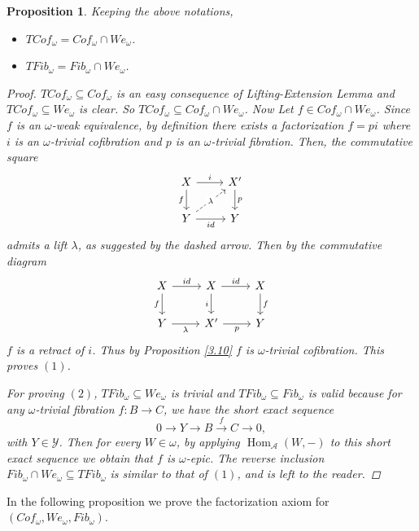 \documentclass[12pt]{amsart}
\numberwithin{equation}{section}
\newtheorem{proposition}[lemma]{Proposition}
\theoremstyle{definition}
\DeclareMathOperator{\Hom}{Hom}
\newtheorem*{theorem 0*}{Theorem}
\newtheorem*{theorem a*}{Theorem A}
\newtheorem*{theorem b*}{Theorem B}
\newcounter{diagram}
\numberwithin{diagram}{section}
\begin{document}
\begin{proposition}\label{3.11}
Keeping the above notations,
\begin{itemize}
\item[(1)]
$TCof_{\omega}=Cof_{\omega}\cap We_{\omega}$.
\item[(2)]
$TFib_{\omega}=Fib_{\omega}\cap We_{\omega}$.
\end{itemize}
\begin{proof}
$TCof_{\omega}\subseteq Cof_{\omega}$ is an easy consequence of Lifting-Extension Lemma and $TCof_{\omega}\subseteq We_{\omega}$ is clear. So $TCof_{\omega}\subseteq Cof_{\omega}\cap We_{\omega}$.
Now Let $f\in Cof_{\omega}\cap We_{\omega}$.
Since $f$ is an $\omega$-weak equivalence, by definition there exists a factorization $f=pi$ where $i$ is an $\omega$-trivial cofibration and $p$ is an $\omega$-trivial fibration. Then, the commutative square
\[\begin{tikzcd}
	X & {X'} \\
	Y & Y
	\arrow["i", from=1-1, to=1-2]
	\arrow["f"', from=1-1, to=2-1]
	\arrow["p", from=1-2, to=2-2]
	\arrow["\lambda"{description}, dashed, from=2-1, to=1-2]
	\arrow["id"', from=2-1, to=2-2]
\end{tikzcd}\]
admits a lift $\lambda$, as suggested by the dashed arrow. 
Then by the commutative diagram
\[\begin{tikzcd}
	X & X & X \\
	Y & {X'} & Y
	\arrow["id", from=1-1, to=1-2]
	\arrow["f"', from=1-1, to=2-1]
	\arrow["id", from=1-2, to=1-3]
	\arrow["i"', from=1-2, to=2-2]
	\arrow["f", from=1-3, to=2-3]
	\arrow["\lambda"', from=2-1, to=2-2]
	\arrow["p"', from=2-2, to=2-3]
\end{tikzcd}\]
$f$ is a retract of $i$. Thus by Proposition \ref{3.10} $f$ is $\omega$-trivial cofibration. This proves $(1)$.

For proving $(2)$, $TFib_{\omega}\subseteq We_{\omega}$ is trivial and $TFib_{\omega}\subseteq Fib_{\omega}$ is valid because for any $\omega$-trivial fibration $f:B\rightarrow C$, we have the short exact sequence 
\[0\rightarrow Y\rightarrow B\overset{f}{\rightarrow}C\rightarrow 0,\]
with $Y\in\mathcal{Y}$. Then for every $W\in\omega$, by applying $\Hom_{\mathcal{A}}(W,-)$ to this short exact sequence we obtain that $f$ is $\omega$-epic.
The reverse inclusion $Fib_{\omega}\cap We_{\omega}\subseteq TFib_{\omega}$ is similar to that of $(1)$, and is left to the reader.
\end{proof}
\end{proposition}	
In the following proposition we prove the factorization axiom for $(Cof_{\omega},We_{\omega},Fib_{\omega})$.
\end{document}
